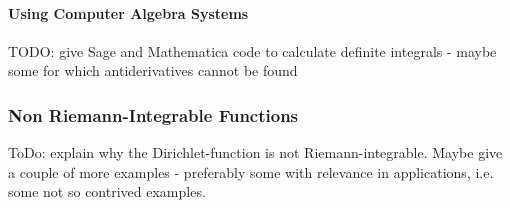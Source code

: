 










\paragraph{Using Computer Algebra Systems}

TODO: give Sage and Mathematica code to calculate definite integrals - maybe some for which antiderivatives cannot be found


\subsubsection{Non Riemann-Integrable Functions} ToDo: explain why the Dirichlet-function is not Riemann-integrable. Maybe give a couple of more examples - preferably some with relevance in applications, i.e. some not so contrived examples.



